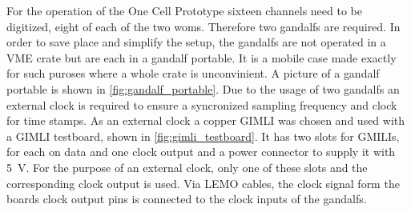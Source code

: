 For the operation of the One Cell Prototype sixteen channels need to be digitized, eight of each of the two \acp{wom}.
Therefore two \acp{gandalf} are required.
In order to save place and simplify the setup, the \acp{gandalf} are not operated in a VME crate but are each in a \ac{gandalf} portable.
It is a mobile case made exactly for such puroses where a whole crate is unconvinient.
A picture of a \ac{gandalf} portable is shown in \autoref{fig:gandalf_portable}.
Due to the usage of two \acp{gandalf} an external clock is required to ensure a syncronized sampling frequency and clock for time stamps.
As an external clock a copper GIMLI was chosen and used with a GIMLI testboard, shown in \autoref{fig:gimli_testboard}.
It has two slots for GMILIs, for each on data and one clock output and a power connector to supply it with \SI{5}{\volt}.
For the purpose of an external clock, only one of these slots and the corresponding clock output is used.
Via LEMO cables, the clock signal form the boards clock output pins is connected to the clock inputs of the \acp{gandalf}.


